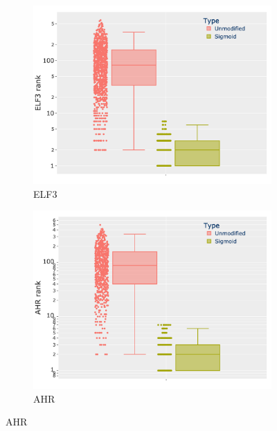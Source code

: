 \begin{figure}[!t]
    \centering
    \begin{subfigure}{0.49\linewidth}
        \includegraphics[width=1.0\textwidth,height=1.0\textheight,keepaspectratio]{Sections/Network_II/resources/reward/corr_analysis/ELF3_box.png}
        \caption{ELF3}
        \label{fig:N_II:ahr_corr}
    \end{subfigure}
    \centering
    \begin{subfigure}{0.49\linewidth}
        \includegraphics[width=1.0\textwidth,height=1.0\textheight,keepaspectratio]{Sections/Network_II/resources/reward/corr_analysis/AHR_box.png}
        \caption{AHR}
        \label{fig:N_II:elf3_corr}
    \end{subfigure} %

\end{figure}
